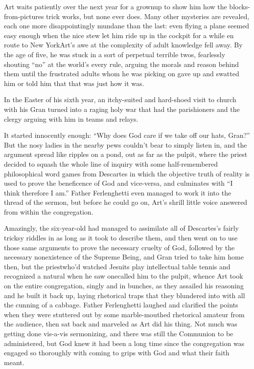 Art waits patiently over the next year for a grownup to show him
how the blocks-from-pictures trick works, but none ever does. Many
other mysteries are revealed, each one more disappointingly mundane
than the last: even flying a plane seemed easy enough when the nice
stew let him ride up in the cockpit for a while en route to New
York{\dash}Art’s awe at the complexity of adult knowledge fell away. By
the age of five, he was stuck in a sort of perpetual terrible twos,
fearlessly shouting “no” at the world’s every rule, arguing the
morals and reason behind them until the frustrated adults whom he
was picking on gave up and swatted him or told him that that was
just how it was.

In the Easter of his sixth year, an itchy-suited and hard-shoed
visit to church with his Gran turned into a raging holy war that
had the parishioners and the clergy arguing with him in teams and
relays.

It started innocently enough: “Why does God care if we take off our
hats, Gran?” But the nosy ladies in the nearby pews couldn’t bear
to simply listen in, and the argument spread like ripples on a
pond, out as far as the pulpit, where the priest decided to squash
the whole line of inquiry with some half-remembered philosophical
word games from Descartes in which the objective truth of reality
is used to prove the beneficence of God and vice-versa, and
culminates with “I think therefore I am.” Father Ferlenghetti even
managed to work it into the thread of the sermon, but before he
could go on, Art’s shrill little voice answered from within the
congregation.

Amazingly, the six-year-old had managed to assimilate all of
Descartes’s fairly tricksy riddles in as long as it took to
describe them, and then went on to use those same arguments to
prove the necessary cruelty of God, followed by the necessary
nonexistence of the Supreme Being, and Gran tried to take him home
then, but the priest{\dash}who’d watched Jesuits play intellectual table
tennis and recognized a natural when he saw one{\dash}called him to the
pulpit, whence Art took on the entire congregation, singly and in
bunches, as they assailed his reasoning and he built it back up,
laying rhetorical traps that they blundered into with all the
cunning of a cabbage. Father Ferlenghetti laughed and clarified the
points when they were stuttered out by some marble-mouthed
rhetorical amateur from the audience, then sat back and marveled as
Art did his thing. Not much was getting done vis-a-vis sermonizing,
and there was still the Communion to be administered, but God knew
it had been a long time since the congregation was engaged so
thoroughly with coming to grips with God and what their faith
meant.

